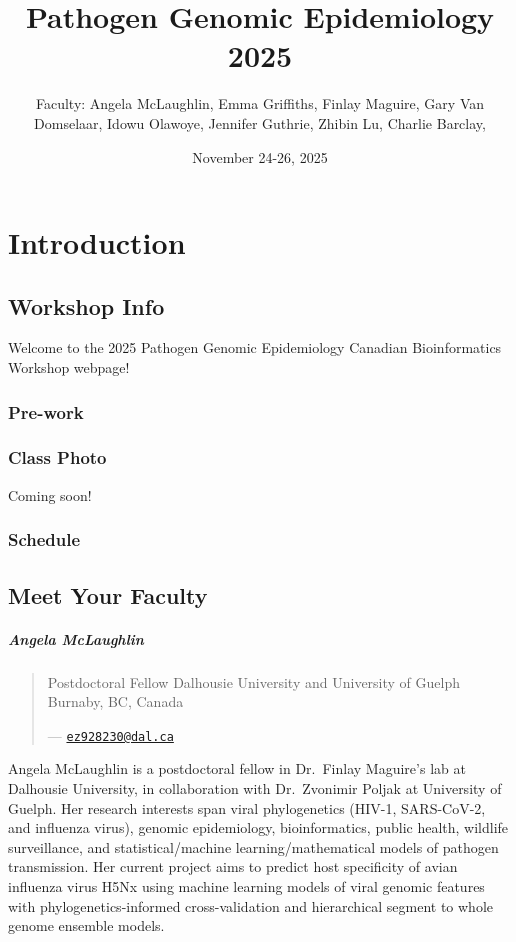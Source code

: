 \documentclass[
]{book}
\title{Pathogen Genomic Epidemiology 2025}
\author{Faculty: Angela McLaughlin, Emma Griffiths, Finlay Maguire, Gary Van Domselaar, Idowu Olawoye, Jennifer Guthrie, Zhibin Lu, Charlie Barclay,}
\date{November 24-26, 2025}
\begin{document}
\maketitle

{
\setcounter{tocdepth}{1}
\tableofcontents
}
\part{Introduction}\label{part-introduction}

\chapter{Workshop Info}\label{workshop-info}

Welcome to the 2025 Pathogen Genomic Epidemiology Canadian Bioinformatics Workshop webpage!

\section{Pre-work}\label{pre-work}

\section{Class Photo}\label{class-photo}

Coming soon!

\section{Schedule}\label{schedule}

\chapter{Meet Your Faculty}\label{meet-your-faculty}

\subsubsection{Angela McLaughlin}\label{angela-mclaughlin}

\begin{quote}
Postdoctoral Fellow
Dalhousie University and University of Guelph
Burnaby, BC, Canada

--- \href{mailto:ez928230@dal.ca}{\nolinkurl{ez928230@dal.ca}}
\end{quote}

Angela McLaughlin is a postdoctoral fellow in Dr.~Finlay Maguire's lab at Dalhousie University, in collaboration with Dr.~Zvonimir Poljak at University of Guelph. Her research interests span viral phylogenetics (HIV-1, SARS-CoV-2, and influenza virus), genomic epidemiology, bioinformatics, public health, wildlife surveillance, and statistical/machine learning/mathematical models of pathogen transmission. Her current project aims to predict host specificity of avian influenza virus H5Nx using machine learning models of viral genomic features with phylogenetics-informed cross-validation and hierarchical segment to whole genome ensemble models.
\end{document}
